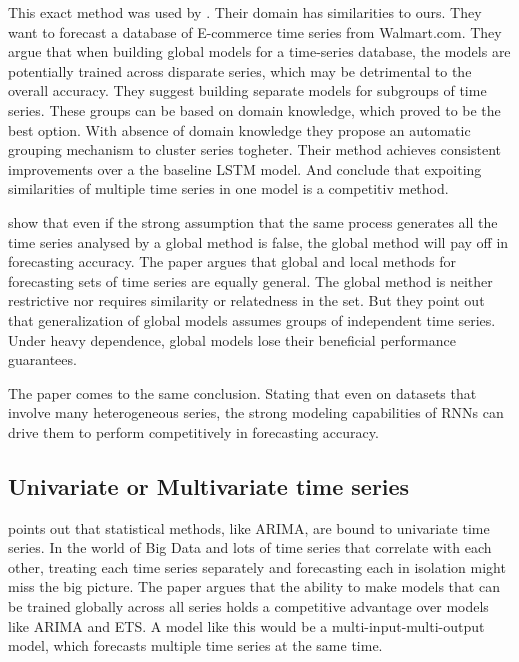 This exact method was used by \cite{Bandara2017}.
Their domain has similarities to ours. They want to forecast a database of E-commerce time series
from Walmart.com.
They argue that when building global models for a time-series database, the models are 
potentially trained across disparate series, which may be detrimental to the overall accuracy.
They suggest building separate models for subgroups of time series.
These groups can be based on domain knowledge, which proved to be the best option. With absence of 
domain knowledge they propose an automatic grouping mechanism to cluster series togheter.
Their method achieves consistent improvements over a the baseline LSTM model.
And conclude that expoiting similarities of multiple time series in one model is a competitiv method.




\cite{Rabanser2020} show that even if the strong assumption that the same process generates all the time series analysed by a global
method is false, the global method will pay off in forecasting accuracy.
The paper argues that global and local methods for forecasting
sets of time series are equally general. The global method is neither restrictive nor requires
similarity or relatedness in the set.
But they point out that generalization of global models assumes groups of independent time series.
Under heavy dependence, global models lose their beneficial performance guarantees. 

The paper \cite{Hewamalage2021} comes to the same conclusion. Stating that 
even on datasets that involve many heterogeneous series, the strong modeling capabilities of RNNs can drive
them to perform competitively in forecasting accuracy.

\subsection{Univariate or Multivariate time series}
\cite{Bandara2017} points out that statistical methods, like ARIMA, are bound to
univariate time series. In the world of Big Data and lots of time series that correlate with each other,
treating each time series separately and forecasting each in isolation might miss the big picture.
The paper argues that the ability to make models that can be trained globally across all series
holds a competitive advantage over models like ARIMA and ETS.
A model like this would be a multi-input-multi-output model, which forecasts multiple time series
at the same time.

